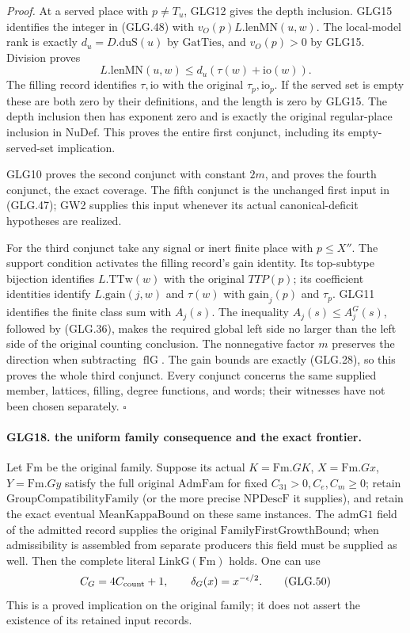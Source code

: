 \emph{Proof.}
At a served place with \(p\ne T_u\), GLG12 gives the
depth inclusion. GLG15 identifies the integer in
(GLG.48) with \(v_O(p)L.\mathrm{lenMN}(u,w)\).
The local-model rank is exactly \(d_u=D.\mathrm{duS}(u)\)
by \(\mathrm{GatTies}\), and \(v_O(p)>0\) by GLG15.
Division proves
\[
           L.\mathrm{lenMN}(u,w)\le d_u(\tau(w)+\mathrm{io}(w)).
 \]
The filling record identifies \(\tau,\mathrm{io}\)
with the original \(\tau_p,\mathrm{io}_p\).
If the served set is empty these are both zero by their
definitions, and the length is zero by GLG15. The depth
inclusion then has exponent zero and is exactly the
original regular-place inclusion in \(\mathrm{NuDef}\).
This proves the entire first conjunct, including its
empty-served-set implication.

GLG10 proves the second conjunct with constant \(2m\),
and proves the fourth conjunct, the exact coverage.
The fifth conjunct is the unchanged first input in
(GLG.47); GW2 supplies this input whenever its actual
canonical-deficit hypotheses are realized.

For the third conjunct take any signal or inert finite
place with \(p\le X''\). The support condition activates
the filling record's gain identity. Its top-subtype
bijection identifies \(L.\mathrm{TTw}(w)\) with the
original \(TTP(p)\); its coefficient identities
identify \(L.\mathrm{gain}(j,w)\) and \(\tau(w)\)
with \(\mathrm{gain}_j(p)\) and \(\tau_p\).
GLG11 identifies the finite class sum with \(A_j(s)\).
The inequality \(A_j(s)\le A_j^G(s)\), followed by
(GLG.36), makes the required global left side no larger
than the left side of the original counting conclusion.
The nonnegative factor \(m\) preserves the direction
when subtracting \(\operatorname{flG}\).
The gain bounds are exactly (GLG.28), so this proves
the whole third conjunct. Every conjunct concerns the
same supplied member, lattices, filling, degree functions,
and words; their witnesses have not been chosen separately.
\hfill\(\square\)

\paragraph{GLG18. the uniform family consequence and the exact frontier.}
\label{claim:GLG18}
Let \(\mathrm{Fm}\) be the original family. Suppose its
actual \(K=\mathrm{Fm}.GK\), \(X=\mathrm{Fm}.Gx\),
\(Y=\mathrm{Fm}.Gy\) satisfy the full original
\(\mathrm{AdmFam}\) for fixed \(C_{31}>0,C_e,C_m\ge0\);
retain \(\mathrm{GroupCompatibilityFamily}\) (or the
more precise \(\mathrm{NPDescF}\) it supplies), and retain
the exact eventual \(\mathrm{MeanKappaBound}\) on these
same instances. The \(\mathrm{admG1}\) field of the
admitted record supplies the original
\(\mathrm{FamilyFirstGrowthBound}\); when admissibility
is assembled from separate producers this field must
be supplied as well.
Then the complete literal \(\mathrm{LinkG}(\mathrm{Fm})\)
holds. One can use
\[
 C_G=4C_{\rm count}+1,\qquad
                   \delta_G(x)=x^{-\epsilon/2}.                  \tag{GLG.50}
\]
This is a proved implication on the original family;
it does not assert the existence of its retained input records.

